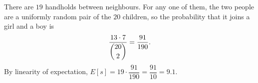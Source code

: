 There are $19$ handholds between neighbours. For any one of them, the two people are a uniformly random pair of the $20$ children, so the probability that it joins a girl and a boy is
\[\dfrac{13\cdot7}{\dbinom{20}{2}}=\dfrac{91}{190}.\]
By linearity of expectation, $E[s]=19\cdot\dfrac{91}{190}=\boxed{\dfrac{91}{10}}=9.1$.
